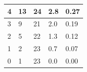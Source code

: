 \documentclass{article}
\begin{document}
\begin{table}[!ht]
\begin{tabular}{|l|l|l|l|l|}
4                        & 13                   & 24                 & 2.8                           & 0.27                    \\ \hline
3                        & 9                    & 21                 & 2.0                           & 0.19                    \\ \hline
2                        & 5                    & 22                 & 1.3                           & 0.12                    \\ \hline
1                        & 2                    & 23                 & 0.7                           & 0.07                    \\ \hline
0                        & 1                    & 23                 & 0.0                           & 0.00                    \\ \hline
\end{tabular}
\end{table}
\end{document}
